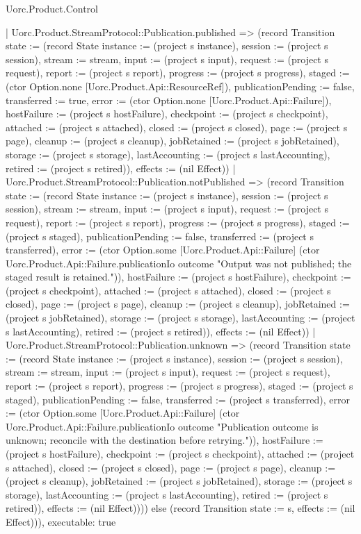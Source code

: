 \begin{lexlean}{Uorc.Product.Control}
\begin{semanticmodule}
{      | Uorc.Product.StreamProtocol::Publication.published => (record Transition {state := (record State {instance := (project s instance), session := (project s session), stream := stream, input := (project s input), request := (project s request), report := (project s report), progress := (project s progress), staged := (ctor Option.none [Uorc.Product.Api::ResourceRef]), publicationPending := false, transferred := true, error := (ctor Option.none [Uorc.Product.Api::Failure]), hostFailure := (project s hostFailure), checkpoint := (project s checkpoint), attached := (project s attached), closed := (project s closed), page := (project s page), cleanup := (project s cleanup), jobRetained := (project s jobRetained), storage := (project s storage), lastAccounting := (project s lastAccounting), retired := (project s retired)}), effects := (nil Effect)})
      | Uorc.Product.StreamProtocol::Publication.notPublished => (record Transition {state := (record State {instance := (project s instance), session := (project s session), stream := stream, input := (project s input), request := (project s request), report := (project s report), progress := (project s progress), staged := (project s staged), publicationPending := false, transferred := (project s transferred), error := (ctor Option.some [Uorc.Product.Api::Failure] (ctor Uorc.Product.Api::Failure.publicationIo outcome "Output was not published; the staged result is retained.")), hostFailure := (project s hostFailure), checkpoint := (project s checkpoint), attached := (project s attached), closed := (project s closed), page := (project s page), cleanup := (project s cleanup), jobRetained := (project s jobRetained), storage := (project s storage), lastAccounting := (project s lastAccounting), retired := (project s retired)}), effects := (nil Effect)})
      | Uorc.Product.StreamProtocol::Publication.unknown => (record Transition {state := (record State {instance := (project s instance), session := (project s session), stream := stream, input := (project s input), request := (project s request), report := (project s report), progress := (project s progress), staged := (project s staged), publicationPending := false, transferred := (project s transferred), error := (ctor Option.some [Uorc.Product.Api::Failure] (ctor Uorc.Product.Api::Failure.publicationIo outcome "Publication outcome is unknown; reconcile with the destination before retrying.")), hostFailure := (project s hostFailure), checkpoint := (project s checkpoint), attached := (project s attached), closed := (project s closed), page := (project s page), cleanup := (project s cleanup), jobRetained := (project s jobRetained), storage := (project s storage), lastAccounting := (project s lastAccounting), retired := (project s retired)}), effects := (nil Effect)}))) else (record Transition {state := s, effects := (nil Effect)})),
  executable: true
}


\end{semanticmodule}
\end{lexlean}
